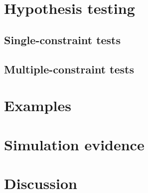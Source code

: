 \documentclass[12pt]{article}\usepackage[]{graphicx}\usepackage[]{color}
\begin{document}
\section{Hypothesis testing}
\label{sec:testing}

\subsection{Single-constraint tests}

\subsection{Multiple-constraint tests}

\section{Examples}
\label{sec:examples}

\section{Simulation evidence}
\label{sec:simulations}

\section{Discussion}
\label{sec:discussion}



\end{document}
